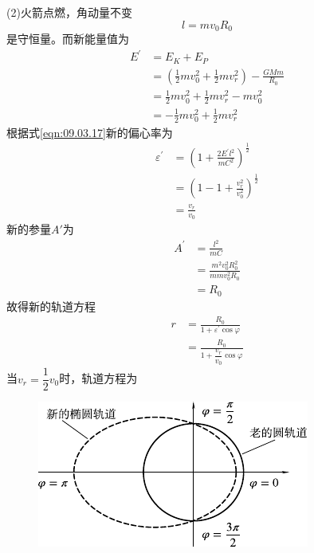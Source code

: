 (2)火箭点燃，角动量不变
\begin{equation*}
  l = m v _ { 0 } R _ { 0 }
\end{equation*}
是守恒量。而新能量值为
\begin{equation*}
  \begin{split}
    E ^ { \prime } &= E _ { K } + E _ { P } \\
    &= \left( \frac { 1 } { 2 } m v _ 0 ^ { 2 } + \frac { 1 } { 2 } m v _ r ^ { 2 } \right) - \frac { G M m } { R _ { 0 } } \\
    &= \frac { 1 } { 2 } m v _ 0 ^ { 2 } + \frac { 1 } { 2 } m v _ r ^ { 2 } - m v _ 0 ^ { 2 } \\
    &= - \frac { 1 } { 2 } m v _ 0 ^ { 2 } + \frac { 1 } { 2 } m v _ r ^ { 2 }
  \end{split}
\end{equation*}
根据式\eqref{eqn:09.03.17}新的偏心率为
\begin{equation*}
  \begin{split}
    \varepsilon ^ { \prime } &= \left( 1 + \frac { 2 E ^ { \prime } l ^ { 2 } } { m C ^ { 2 } } \right) ^ { \frac { 1 } { 2 } } \\
    &= \left( 1 - 1 + \frac { v _ { r } ^ { 2 } } { v _ 0 ^ { 2 } } \right) ^ { \frac { 1 } { 2 } } \\
    &= \frac { v _ { r } } { v _ { 0 } }
  \end{split}
\end{equation*}
新的参量$ A ' $为
\begin{equation*}
  \begin{split}
    A ^ { \prime } &= \frac { l ^ { 2 } } { m C } \\
    &= \frac { m ^ { 2 } v _ 0 ^ { 2 } R _ 0 ^ { 2 } } { m m v _ 0 ^ { 2 } R _ { 0 } } \\
    &= R _ { 0 }
  \end{split}
\end{equation*}
故得新的轨道方程
\begin{equation*}
  \begin{split}
    r &= \frac { R _ { 0 } } { 1 + \varepsilon ^ { \prime } \cos \varphi } \\
    &= \frac { R _ { 0 } } { 1 + \dfrac { v _ { r } } { v _ { 0 } } \cos \varphi }
  \end{split}
\end{equation*}
当$ v _ { r } = \dfrac { 1 } { 2 } v _ { 0 } $时，轨道方程为
\vspace{-0.5em}
\begin{figure}[h]
  \centering
  \includegraphics{figure/fig09.08}
  \caption{}
  \label{fig:09.08}
\end{figure}
